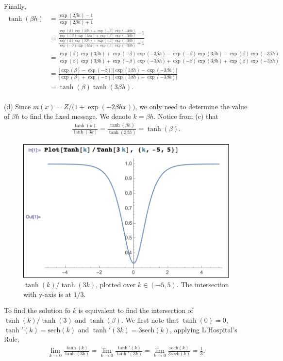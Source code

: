 \documentclass{article}
\newcommand{\qeds}{\hfill\qedsymbol}
\begin{document}
Finally,
\begin{align*}
	\tanh(\beta h) &= \frac{\exp(2\beta h) - 1}{ \exp(2\beta h) + 1} \\
	&= \frac{\frac{\exp(\beta)\exp(3\beta h) +
	        \exp(-\beta)\exp(-3\beta h)}
	       {\exp(-\beta)\exp(3\beta h) +
	        \exp(\beta)\exp(-3\beta h)} - 1}
	        {\frac{\exp(\beta)\exp(3\beta h) +
	        \exp(-\beta)\exp(-3\beta h)}
	       {\exp(-\beta)\exp(3\beta h) +
	        \exp(\beta)\exp(-3\beta h)} + 1} \\
    &= \frac{\exp(\beta)\exp(3\beta h) + \exp(-\beta)\exp(-3\beta h) -
             {\exp(-\beta)\exp(3\beta h) - \exp(\beta)\exp(-3\beta h)}}
            {\exp(\beta)\exp(3\beta h) + \exp(-\beta)\exp(-3\beta h) +
             {\exp(-\beta)\exp(3\beta h) + \exp(\beta)\exp(-3\beta h)}} \\
    &= \frac{\big[\exp(\beta) - \exp(-\beta)\big]
             \big[\exp(3\beta h) - \exp(-3\beta h)\big]}
            {\big[\exp(\beta) + \exp(-\beta)\big]
             \big[\exp(3\beta h) + \exp(-3\beta h)\big]}\\
    &= \tanh(\beta) \tanh(3\beta h).
\end{align*}\qeds
\\

\noindent
(d) Since $m(x) = Z/\big(1 + \exp(-2\beta h x)\big)$, we only need to determine the value
of $\beta h$ to find the fixed message. We denote $k = \beta h$. Notice from (c) that
\begin{align*}
	\frac{\tanh(k)}{\tanh(3k)} = \frac{\tanh(\beta h)}{\tanh(3\beta h)} = \tanh(\beta).
\end{align*}
%
\begin{figure}[h]
  \centering
  \includegraphics[width=0.4\columnwidth]{5d.pdf}
    \vspace{-0.1cm}
  \caption{$\tanh(k)/\tanh(3k)$, plotted over $k\in(-5,5)$. The intersection with y-axis is at $1/3$.}
  \label{f:5d}
\end{figure}
%

To find the solution fo $k$ is equivalent to find the intersection of $\tanh(k)/\tanh(3)$ and $\tanh(\beta)$.
We first note that $\tanh(0) = 0$, $\tanh'(k) = \text{sech}(k)$ and $\tanh'(3k) = 3\text{sech}(k)$,
applying L'Hospital's Rule,
\begin{align*}
	\lim_{k\to 0} \frac{\tanh(k)}{\tanh(3k)} = \lim_{k\to 0} \frac{\tanh'(k)}{\tanh'(3k)} = \lim_{k\to 0} \frac{\text{sech}(k)}{3\text{sech}(k)} = \frac{1}{3}.
\end{align*}
\end{document}
